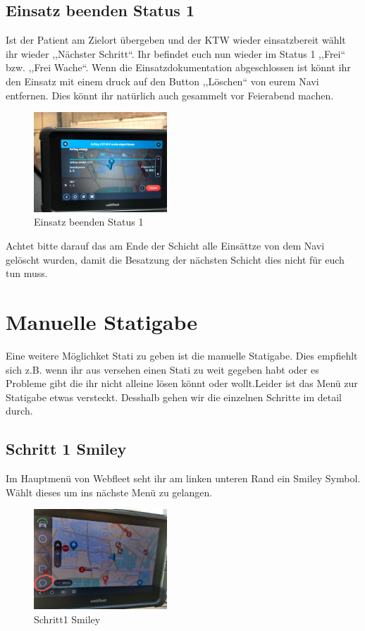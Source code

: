 \documentclass[a4paper,12pt]{scrartcl}
\begin{document}
    \subsection{Einsatz beenden Status 1}
    Ist der Patient am Zielort übergeben und der KTW wieder einsatzbereit wählt ihr wieder ,,Nächster Schritt``.
    Ihr befindet euch nun wieder im Status 1 ,,Frei`` bzw. ,,Frei Wache``. Wenn die Einsatzdokumentation abgeschlossen ist 
    könnt ihr den Einsatz mit einem druck auf den Button ,,Löschen`` von eurem Navi entfernen. Dies könnt ihr natürlich 
    auch gesammelt vor Feierabend machen. 
    \begin{figure}[h]
        \begin{center}
            \includegraphics[width=5cm]{bilder/beenden.jpg}
            \caption{Einsatz beenden Status 1}
            \label{Beenden}
        \end{center} 
    \end{figure}
    \newline Achtet bitte darauf das am Ende der Schicht alle Einsättze von dem Navi gelöscht wurden, damit die Besatzung
    der nächsten Schicht dies nicht für euch tun muss.

    \newpage
    \section{Manuelle Statigabe}
    Eine weitere Möglichket Stati zu geben ist die manuelle Statigabe. Dies empfiehlt sich z.B. wenn ihr
    aus versehen einen Stati zu weit gegeben habt oder es Probleme gibt die ihr nicht alleine lösen 
    könnt oder wollt.Leider ist das Menü zur Statigabe etwas versteckt.
    Desshalb gehen wir die einzelnen Schritte im detail durch.
    

    \subsection{Schritt 1 Smiley}
    Im Hauptmenü von Webfleet seht ihr am linken unteren Rand ein Smiley Symbol. Wählt dieses um ins nächste
    Menü zu gelangen.
    \begin{figure}[h]
        \begin{center}
            \includegraphics[width=5cm]{bilder/Schritt1.jpg}
            \caption{Schritt1 Smiley}
            \label{Smiley}
        \end{center} 
    \end{figure}
\end{document}
